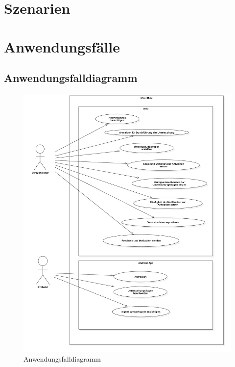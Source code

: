 \documentclass[a4paper]{scrreprt}
\begin{document}
        \section{Szenarien}

        \section{Anwendungsf\"alle}

            \subsection{Anwendungsfalldiagramm}
                \vspace{0.4cm}
                \begin{figure}
                    \centering
                    \includegraphics[scale = 0.4]{UseCaseDiagram1.jpg}
                    \caption{Anwendungsfalldiagramm}
                \end{figure}


    \glsaddall
    \printglossaries

    \listoffigures
\end{document}
